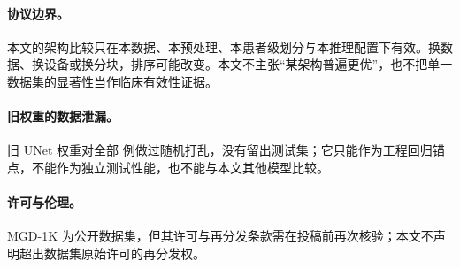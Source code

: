 \paragraph{协议边界。}本文的架构比较只在本数据、本预处理、本患者级划分与本推理配置下有效。换数据、换设备或换分块，排序可能改变。本文不主张“某架构普遍更优”，也不把单一数据集的显著性当作临床有效性证据。

\paragraph{旧权重的数据泄漏。}旧 UNet 权重对全部 \nTotal{} 例做过随机打乱，没有留出测试集；它只能作为工程回归锚点，不能作为独立测试性能，也不能与本文其他模型比较。

\paragraph{许可与伦理。}MGD-1K 为公开数据集，但其许可与再分发条款需在投稿前再次核验；本文不声明超出数据集原始许可的再分发权。
